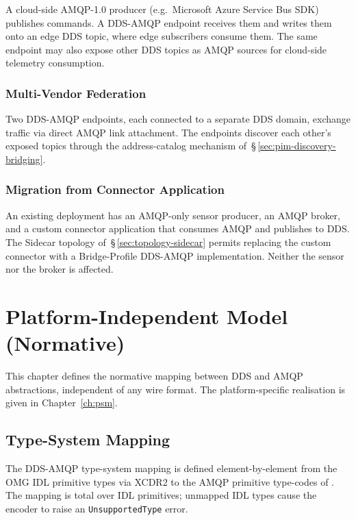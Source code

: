 \documentclass{../styles/zerodds-vendor-spec}
\begin{document}
A cloud-side AMQP-1.0 producer (e.g.\ Microsoft Azure Service Bus
SDK) publishes commands. A DDS-AMQP endpoint receives them and
writes them onto an edge DDS topic, where edge subscribers consume
them. The same endpoint may also expose other DDS topics as AMQP
sources for cloud-side telemetry consumption.

\subsection{Multi-Vendor Federation}

Two DDS-AMQP endpoints, each connected to a separate DDS domain,
exchange traffic via direct AMQP link attachment. The endpoints
discover each other's exposed topics through the address-catalog
mechanism of~\S\,\ref{sec:pim-discovery-bridging}.

\subsection{Migration from Connector Application}

An existing deployment has an AMQP-only sensor producer, an AMQP
broker, and a custom connector application that consumes AMQP and
publishes to DDS. The Sidecar topology of~\S\,\ref{sec:topology-sidecar}
permits replacing the custom connector with a Bridge-Profile
DDS-AMQP implementation. Neither the sensor nor the broker is
affected.

\chapter{Platform-Independent Model (Normative)}\label{ch:pim}

This chapter defines the normative mapping between DDS and AMQP
abstractions, independent of any wire format. The platform-specific
realisation is given in Chapter~\ref{ch:psm}.

\section{Type-System Mapping}\label{sec:pim-type-mapping}

The DDS-AMQP type-system mapping is defined element-by-element from
the OMG IDL primitive types via XCDR2 to the AMQP primitive
type-codes of . The mapping is
total over IDL primitives; unmapped IDL types  cause
the encoder to raise an \texttt{UnsupportedType} error.
\end{document}
